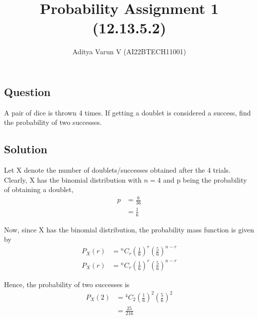\documentclass[12pt,twocolumn,notitlepage]{article}
\title{Probability Assignment 1 (12.13.5.2)}
\author{Aditya Varun V (AI22BTECH11001)}
\date{}
\providecommand{\brak}[1]{\ensuremath{\left(#1\right)}}
\newcommand*{\comb}[2]{{}^{#1}C_{#2}}
\begin{document}
\maketitle
\subsection*{Question}
A pair of dice is thrown 4 times. If getting a doublet is considered a success, find
the probability of two successes.


\subsection*{Solution}

Let X denote the number of doublets/successes obtained after the 4 trials. Clearly, X has the binomial distribution with $n=4$ and p being the probability of obtaining a doublet,
\begin{align}
    p &= \frac{6}{36} \\
    &= \frac{1}{6} 
\end{align}

Now, since X has the binomial distribution, the probability mass function is given by
\begin{align}
    P_X\brak{r} &= \comb{n}{r}\left(\frac{1}{6}\right)^{r}\left(\frac{5}{6}\right)^{n-r} \\
    P_X\brak{r} &= \comb{n}{r}\left(\frac{1}{6}\right)^{r}\left(\frac{5}{6}\right)^{n-r} 
\end{align}

Hence, the probability of two successes is
\begin{align}
    P_X\brak{2} &= \comb{4}{2}\left(\frac{1}{6}\right)^{2}\left(\frac{5}{6}\right)^{2} \\
    &= \frac{25}{216} 
\end{align}
\end{document}
